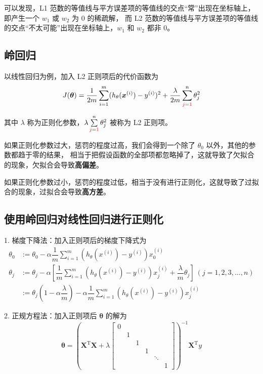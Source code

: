 可以发现，L1 范数的等值线与平方误差项的等值线的交点“常”出现在坐标轴上，即产生一个 $w_1$ 或 $w_2$ 为 0 的稀疏解，
而 L2 范数的等值线与平方误差项的等值线的交点“不太可能”出现在坐标轴上，$w_1$ 和 $w_2$ 都非 0。

\subsection{岭回归}

以线性回归为例，加入 L2 正则项后的代价函数为
\begin{equation}
    J(\boldsymbol{\theta}) = \dfrac{1}{2m}\sum_{i=1}^m(h_\theta(\boldsymbol{x}^{(i)}) - y^{(i)})^2 + \dfrac{\lambda}{2m}\sum_{\textcolor{red}{j=1}}^n\theta_j^2
\end{equation}

其中 $\lambda$ 称为正则化参数，$\lambda\sum\limits_{\textcolor{red}{j=1}}^n\theta_j^2$ 被称为 L2 正则项。

如果正则化参数过大，惩罚的程度过高，我们会得到一个除了 $\theta_0$ 以外，其他的参数都趋于零的结果，
相当于把假设函数的全部项都忽略掉了，这就导致了欠拟合的现象，欠拟合会导致\textbf{高偏差}。

如果正则化参数过小，惩罚的程度过低，相当于没有进行正则化，这就导致了过拟合的现象，过拟合会导致\textbf{高方差}。

\subsection{使用岭回归对线性回归进行正则化}
1. 梯度下降法：加入正则项后的梯度下降式为
\begin{equation}
    \begin{aligned}
        \theta_0 &:= \theta_0 - \alpha \dfrac 1m \sum\limits_{i = 1}^m {\left(h_\theta(x^{(i)}) - y^{(i)}\right)}x_0^{(i)} \\
        \theta_j &:= \theta_j - \alpha \left[\dfrac 1m \sum\limits_{i = 1}^m {\left(h_\theta(x^{(i)}) - y^{(i)}\right)}x_j^{(i)} + \dfrac{\lambda}{m}\theta_j\right]\ (j = 1, 2, 3, \dots, n) \\
        &:=\theta_{j}\left(1-\alpha \dfrac{\lambda}{m}\right)-\alpha \dfrac{1}{m} \sum_{i=1}^{m}\left(h_{\theta}\left(x^{(i)}\right)-y^{(i)}\right) x_{j}^{(i)}
    \end{aligned}
\end{equation}

2. 正规方程法：加入正则项后 $\boldsymbol{\theta}$ 的解为
\begin{equation}
    \boldsymbol\theta = \left(\mathbf{X}^{\mathrm{T}}\mathbf{X} + \lambda \begin{bmatrix}0 & & & & & \\ & 1 & & & & 
        \\ & & 1 & & & \\ & & & 1 & & \\& & & & \ddots & 
        \\ & & & & & 1\end{bmatrix}\right)^{-1}\mathbf{X}^{\mathrm{T}}y
\end{equation}

